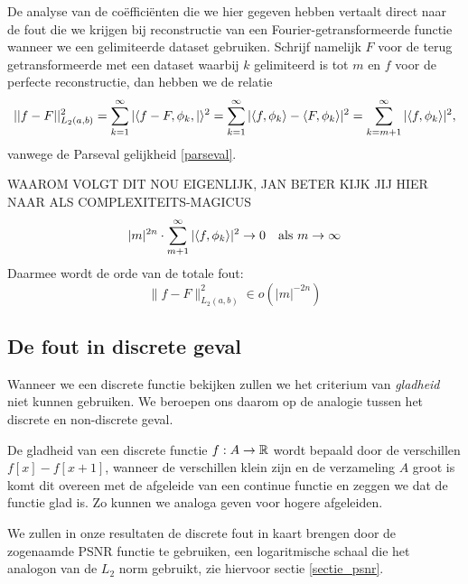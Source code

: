 De analyse van de co\"effici\"enten die we hier gegeven hebben vertaalt direct naar de fout die we krijgen
bij reconstructie van een Fourier-getransformeerde functie wanneer we een gelimiteerde dataset gebruiken.
Schrijf namelijk $F$ voor de terug getransformeerde met een dataset waarbij $k$ gelimiteerd is tot $m$ en $f$ voor
de perfecte reconstructie, dan hebben we de relatie
\[
  || f - F||^2_{L_2(a,b)} = \sum_{k=1}^\infty |\langle f-F,\phi_k , | \rangle^2 = \sum_{k=1}^\infty |\langle f , \phi_k \rangle 
  - \langle F , \phi_k \rangle|^2 = \sum_{k=m+1}^\infty |\langle f , \phi_k \rangle|^2,
\]
vanwege de Parseval gelijkheid \ref{parseval}.

WAAROM VOLGT DIT NOU EIGENLIJK, JAN BETER KIJK JIJ HIER NAAR ALS COMPLEXITEITS-MAGICUS
\[
|m|^{2n} \cdot \sum_{m+1}^\infty |\langle f , \phi_k \rangle|^2 \to 0 \quad \text{als } m\to\infty
\]
Daarmee wordt de orde van de totale fout:
\[
\|f-F\|_{L_2(a,b)}^2 \in o\left ( |m|^{-2n} \right)
\]

\subsection{De fout in discrete geval}
Wanneer we een discrete functie bekijken zullen we het criterium van \emph{gladheid} niet kunnen gebruiken.
We beroepen ons daarom op de analogie tussen het discrete en non-discrete geval.

De gladheid van een discrete functie $f:A\to\mathbb{R}$ wordt bepaald door de verschillen $f[x]-f[x+1]$,
wanneer de verschillen klein zijn en de verzameling $A$ groot is komt dit overeen met de afgeleide van een 
continue functie en zeggen we dat de functie glad is. Zo kunnen we analoga geven voor hogere afgeleiden.

We zullen in onze resultaten de discrete fout in kaart brengen door de zogenaamde PSNR functie te gebruiken,
een logaritmische schaal die het analogon van de $L_2$ norm gebruikt, zie hiervoor sectie \ref{sectie_psnr}.

